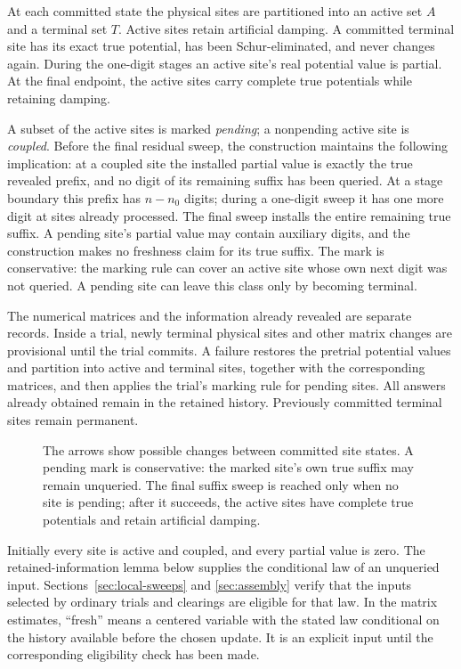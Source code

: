 At each committed state the physical sites are partitioned into an
active set $A$ and a terminal set $T$. Active sites retain artificial
damping. A committed terminal site has its exact true potential, has
been Schur-eliminated, and never changes again. During the one-digit
stages an active site's real potential value is partial. At the final
endpoint, the active sites carry complete true potentials while retaining
damping.

A subset of the active sites is marked \emph{pending}; a nonpending
active site is \emph{coupled}. Before the final residual sweep, the
construction maintains the following implication: at a coupled site the
installed partial value is exactly the true revealed prefix, and no digit
of its remaining suffix has been queried. At a stage boundary this prefix
has $n-n_0$ digits; during a one-digit sweep it has one more digit at sites
already processed. The final sweep installs the entire remaining true
suffix. A pending site's partial value may contain auxiliary digits, and
the construction makes no freshness claim for its true suffix. The mark
is conservative: the marking rule can cover an active site whose own next
digit was not queried. A pending site can leave this class only by becoming
terminal.

The numerical matrices and the information already revealed are separate
records. Inside a trial, newly terminal physical sites and other matrix
changes are provisional until the trial commits. A failure restores the
pretrial potential values and partition into active and terminal sites,
together with the corresponding matrices, and then applies the trial's
marking rule for pending sites.
All answers already obtained remain in the retained history. Previously
committed terminal sites remain permanent.

\begin{figure}[H]
 \centering
 
 \caption{The arrows show possible changes between committed site states.
 A pending mark is conservative: the marked site's own true suffix may
 remain unqueried. The final suffix sweep is reached only when no site is
 pending; after it succeeds, the active sites have complete true potentials
 and retain artificial damping.}
 \label{fig:site-states}
\end{figure}

Initially every site is active and coupled, and every partial value is
zero. The retained-information lemma below supplies the conditional law
of an unqueried input. Sections~\ref{sec:local-sweeps} and
\ref{sec:assembly} verify that the inputs selected by ordinary trials
and clearings are eligible for that law. In the matrix estimates,
``fresh'' means a centered variable with the stated law conditional on
the history available before the chosen update. It is an explicit input
until the corresponding eligibility check has been made.

